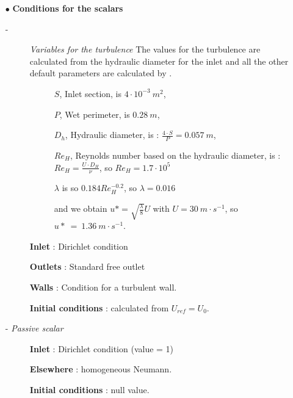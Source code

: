 \begin{itemize}
\item[$\bullet$] {\textbf{ Conditions for the scalars}}
\begin{description}

\item[-]{\it Variables for the turbulence}
%
\newline
The values for the turbulence are calculated from the hydraulic diameter for the inlet and all the other default parameters are calculated by \CS.

\begin{description}
\item[]$S$, Inlet section, is $4\cdot10^{-3}~m^2$,
\item[]$P$, Wet perimeter, is $0.28~m$,
\item[]$D_h$, Hydraulic diameter, is : $\frac{4\cdot S}{P} = 0.057~m$,
\item[]$Re_H$, Reynolds number based on the hydraulic diameter, is : $Re_H=\frac{U\cdot D_H}{\nu}$, so $Re_H=1.7\cdot10^5$
\item[]$\lambda$ is so $0.184 Re_H^{-0.2}$, so $\lambda =0.016$
\item[]and we obtain $u*=\sqrt{\frac{\lambda}{8}}U$ with $U=30~m \cdot s^{-1}$, so $u*~=~1.36~m\cdot s^{-1}$.
\end{description}

\item[]{\textbf{ Inlet} :} Dirichlet condition
\item[]{\textbf{ Outlets} :} Standard free outlet
\item[]{\textbf{ Walls} :} Condition for a turbulent wall. 
\item[]{\textbf{ Initial conditions} :} calculated from $U_{ref}=U_{0}$.
\end{description}

\item[-]{\it Passive scalar}

\begin{description}
\item[]{\textbf{ Inlet} :} Dirichlet condition (value = 1) 
\item[]{\textbf{ Elsewhere} :} homogeneous Neumann. 
\item[]{\textbf{ Initial conditions} :} null value.
\end{description}


\end{itemize}
